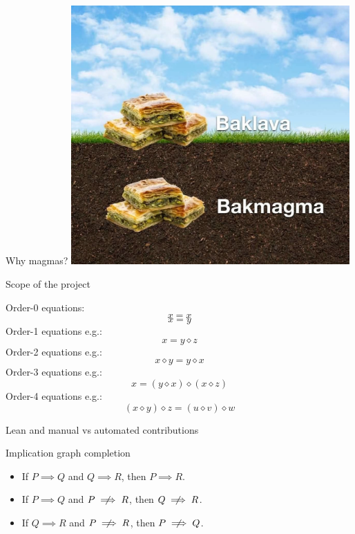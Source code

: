 \documentclass{beamer}
\newcommand{\op}{\diamond}
\begin{document}
\begin{frame}{Why magmas?}
\includegraphics[width=0.8\textwidth]{baklava}
\end{frame}


\begin{frame}{Scope of the project}

Order-0 equations:\vspace*{-1mm}
\[ x = x \tag{E1} \]
\[ x = y \tag{E2} \]
Order-1 equations e.g.:\vspace*{-1mm}
\[ x = y \op z \tag{E7} \]
Order-2 equations e.g.:\vspace*{-3mm}
\[ x \op y = y \op x \tag{E43} \]
Order-3 equations e.g.:\vspace*{-2mm}
\[ x = (y \op x) \op (x \op z) \tag{E168} \]
Order-4 equations e.g.:\vspace*{-2mm}
\[ (x \op y) \op z = (u \op v) \op w \tag{E4694} \]

\end{frame}


\begin{frame}{Lean and manual vs automated contributions}
\end{frame}


\begin{frame}{Implication graph completion}
\begin{itemize}
	\item If $P \implies Q$ and $Q \implies R$, then $P \implies R$.
	\item If $P \implies Q$ and $P \centernot\implies R$, then $Q \centernot\implies R$.
	\item If $Q \implies R$ and $P \centernot\implies R$, then $P \centernot\implies Q$.
\end{itemize}
\end{frame}
\end{document}
